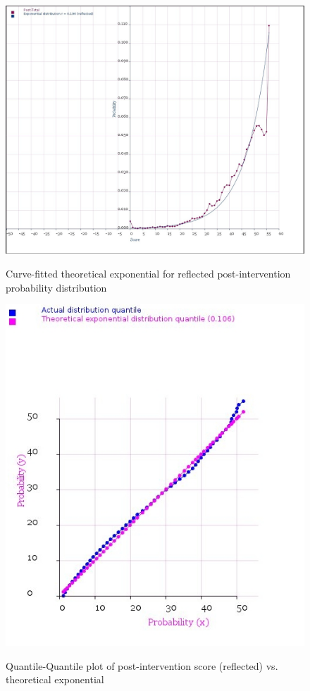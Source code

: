 \documentclass[10pt]{article}
\begin{document}
\begin{figure}
\caption{Curve-fitted theoretical exponential for reflected post-intervention probability distribution}
\label{ExponentialProbabilityPost}
\begin{center}
\includegraphics[width=160mm]{ReportMedia/ExponentialProbabilityPost.jpg}\\
\end{center}
\end{figure}
\newpage
\begin{figure}
\caption{Quantile-Quantile plot of post-intervention score (reflected) vs. theoretical exponential}
\label{QQPlotPostVsExponential}
\begin{center}
\includegraphics[width=120mm]{ReportMedia/QQPlotPostVsExponential.jpg}\\
\end{center}
\end{figure}
\newpage
\end{document}
